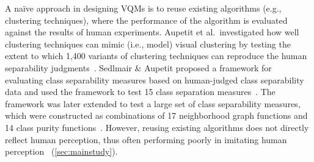 A na{\"i}ve approach in designing VQMs is to reuse existing algorithms (e.g., clustering techniques), 
where the performance of the algorithm is evaluated against the 
results of human experiments.
Aupetit et al.\ investigated how well clustering techniques can mimic (i.e., model) visual clustering by testing the extent to which 1,400 variants of clustering techniques can reproduce the human separability judgments~\cite{aupetit19vis}. 
Sedlmair \& Aupetit proposed a framework for evaluating class separability measures based on human-judged class separability data and 
used the framework to test 15 class separation measures~\cite{sedlmair2015data}.
The framework was later extended to test a large set of class separability measures, which were constructed as combinations of 17 neighborhood graph functions and 14 class purity functions~\cite{aupetit2016sepme}. However, reusing existing algorithms does not directly reflect human perception, thus often performing poorly in imitating human perception~\cite{abbas19cgf} (\autoref{sec:mainstudy}).

